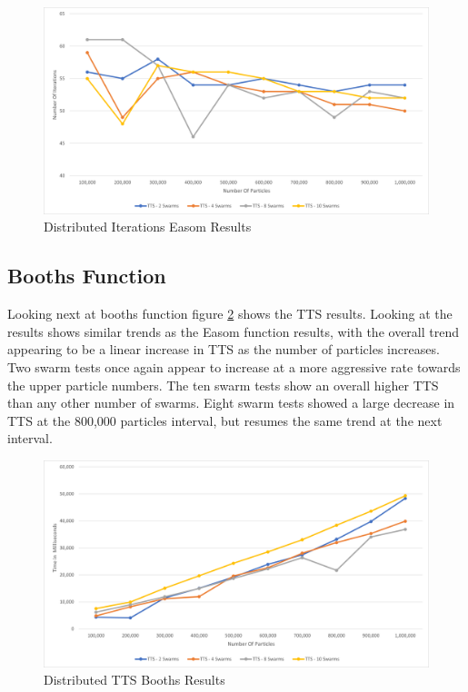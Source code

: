 \documentclass[oneside,12pt]{book}
\begin{document}
\begin{figure}[H]
    \centering
    \includegraphics[scale=0.45]{Images/Graphs/DistributedEasomEpoch.png}
    \caption{Distributed Iterations Easom Results}
    \label{fig:Distributed_Epoc_Easom_Results}
\end{figure}

\subsection{Booths Function}
Looking next at booths function figure \ref{fig:Distributed_TTS_Booths_Results} shows the TTS results. Looking at the results shows similar trends as the Easom function results, with the overall trend appearing to be a linear increase in TTS as the number of particles increases. Two swarm tests once again appear to increase at a more aggressive rate towards the upper particle numbers. The ten swarm tests show an overall higher TTS than any other number of swarms. Eight swarm tests showed a large decrease in TTS at the 800,000 particles interval, but resumes the same trend at the next interval. 

\begin{figure}[H]
    \centering
    \includegraphics[scale=0.45]{Images/Graphs/DistributedBoothsTTS.png}
    \caption{Distributed TTS Booths Results}
    \label{fig:Distributed_TTS_Booths_Results}
\end{figure}
\end{document}
